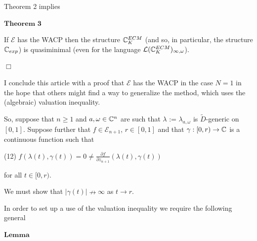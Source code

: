 \documentclass[12pt,nodate]{article}
\begin{document}
 Theorem 2 implies
 
 \vspace{2mm}
 
 \noindent
 $\mathbf{Theorem}$ $\mathbf{3}$
 
 \vspace{1mm}
 
 If $\mathcal{E}$ has the WACP then the structure $\mathbb{C}^{ECM}_{K}$ (and so, in particular, the structure $\mathbb{C}_{exp}$) is quasiminimal (even for the language $\mathcal{L}(\mathbb{C}^{ECM}_{K})_{\infty , \omega}$).
 
 \hspace{120mm} $\Box$
 
 \vspace{4mm}
 
 I conclude this article with a proof that $\mathcal{E}$ has the WACP in the case $N=1$ in the hope that others might find a way to generalize the method, which uses the (algebraic) valuation inequality.
 
 \vspace{2mm}
 
 So, suppose that $n \geq 1$ and $a, \omega \in \mathbb{C}^{n}$ are such that $\lambda$ := $\lambda_{a, \omega}$ is $\widetilde{D}$-generic on $[0, 1]$. Suppose further that $f \in \mathcal{E}_{n+1}$, $r \in [0, 1]$ and that $\gamma : [0, r) \rightarrow \mathbb{C}$ is a continuous function such that
 
 \vspace{3mm}
 
 \noindent
 (12) \hspace{2mm} $f(\lambda (t), \gamma (t)) = 0 \neq \frac{\partial f}{\partial z_{n+1}} (\lambda (t), \gamma (t))$
 
 \vspace{1mm}
 
 \noindent
 for all $t \in [0, r)$.
 
 \vspace{2mm}
 
 We must show that $|\gamma (t)| \nrightarrow \infty$ as $t \rightarrow r$.
 
 \vspace{1mm}
 
 In order to set up a use of the valuation inequality we require the following general
 
 \vspace{2mm}
 
 \noindent
 $\mathbf{Lemma}$
 
 \vspace{1mm}
 
\end{document}
